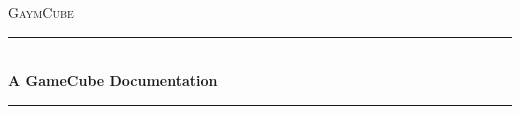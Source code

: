 
\begin{titlepage}

    \newcommand{\HRule}{\rule{\linewidth}{0.1mm}} %
    
    \center %
     
    
    \textsc{\LARGE GaymCube}\\[1.5cm] %
    
    
    \HRule \\[0.4cm]
    { \huge \bfseries A GameCube Documentation}\\[0.4cm] %
    \HRule \\[1.5cm]
     
    
        


\end{titlepage}
